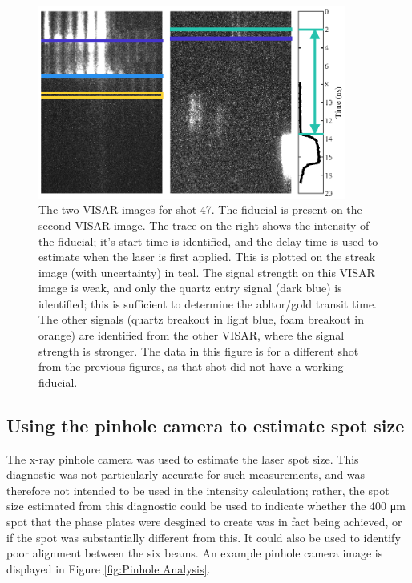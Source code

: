 \begin{figure} [h]
\begin{centering}
\includegraphics[width=0.9\textwidth]{figures/Experiment/FiduPlot.eps}%
\caption{\label{fig:Fidu} The two VISAR images for shot 47. The fiducial is present on the second VISAR image. The trace on the right shows the intensity of the fiducial; it's start time is identified, and the delay time is used to estimate when the laser is first applied. This is plotted on the streak image (with uncertainty) in teal. The signal strength on this VISAR image is weak, and only the quartz entry signal (dark blue) is identified; this is sufficient to determine the abltor/gold transit time. The other signals (quartz breakout in light blue, foam breakout in orange) are identified from the other VISAR, where the signal strength is stronger. The data in this figure is for a different shot from the previous figures, as that shot did not have a working fiducial.}
\end{centering}
\end{figure}



\subsection{Using the pinhole camera to estimate spot size} \label{Estimating spot size}

The x-ray pinhole camera was used to estimate the laser spot size. This diagnostic was not particularly accurate for such measurements, and was therefore not intended to be used in the intensity calculation; rather, the spot size estimated from this diagnostic could be used to indicate whether the 400 \unit{\micro\meter} spot that the phase plates were desgined to create was in fact being achieved, or if the spot was substantially different from this. It could also be used to identify poor alignment between the six beams. An example pinhole camera image is displayed in Figure \ref{fig:Pinhole Analysis}.

